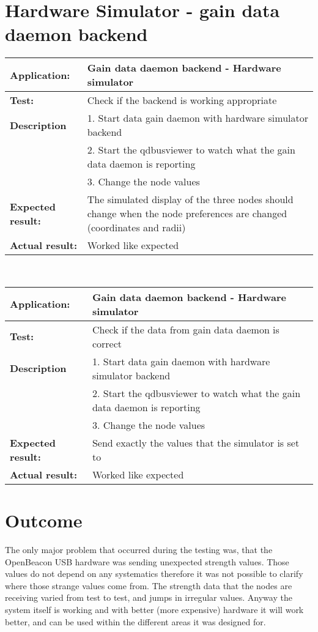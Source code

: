  \section{Hardware Simulator - gain data daemon backend}
   \begin{tabular}{|p{3.5cm}|p{10.5cm}|}
    \hline
     \textbf{Application:}	& Gain data daemon backend - Hardware simulator\\
    \hline
     \textbf{Test:}		& Check if the backend is working appropriate\\
    \hline
     \textbf{Description}	& 1. Start data gain daemon with hardware simulator backend\\
				& 2. Start the qdbusviewer to watch what the gain data daemon is reporting\\
				& 3. Change the node values\\
    \hline
     \textbf{Expected result:}	& The simulated display of the three nodes should change when the node preferences are changed (coordinates and radii)\\
    \hline
     \textbf{Actual result:}	& Worked like expected\\
    \hline
   \end{tabular}\\
   \begin{tabular}{|p{3.5cm}|p{10.5cm}|}
    \hline
     \textbf{Application:}	& Gain data daemon backend - Hardware simulator\\
    \hline
     \textbf{Test:}		& Check if the data from gain data daemon is correct\\
    \hline
     \textbf{Description}	& 1. Start data gain daemon with hardware simulator backend\\
				& 2. Start the qdbusviewer to watch what the gain data daemon is reporting\\
				& 3. Change the node values\\
    \hline
     \textbf{Expected result:}	& Send exactly the values that the simulator is set to\\
    \hline
     \textbf{Actual result:}	& Worked like expected\\
    \hline
   \end{tabular}

 \section{Outcome}
  The only major problem that occurred during the testing was, that the OpenBeacon USB hardware was sending unexpected strength values. Those values do not depend on any systematics therefore it was not possible to clarify where those strange values come from. The strength data that the nodes are receiving varied from test to test, and jumps in irregular values. Anyway the system itself is working and with better (more expensive) hardware it will work better, and can be used within the different areas it was designed for.
